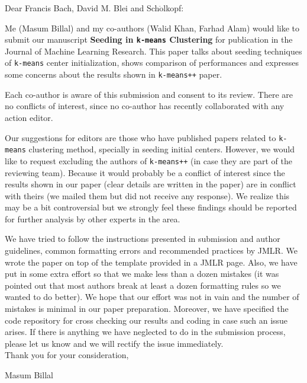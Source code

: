 \documentclass[twoside,11pt]{article} %
\begin{document}
	\noindent Dear Francis Bach, David M. Blei and Sch$\ddot{\mbox{o}}$lkopf: \\
	\medskip
	
	Me (Masum Billal) and my co-authors (Walid Khan, Farhad Alam) would like to submit our manuscript \textbf{Seeding in \texttt{k-means} Clustering} for publication in the Journal of Machine Learning Research. This paper talks about seeding techniques of \texttt{k-means} center initialization, shows comparison of performances and expresses some concerns about the results shown in \texttt{k-means++} paper.\\
	\medskip
	
	Each co-author is aware of this submission and consent to its review.  There are no conflicts of interest, since no co-author has recently collaborated with any action editor.
	\\
	\medskip
	
	Our suggestions for editors are those who have published papers related to \texttt{k-means} clustering method, specially in seeding initial centers. However, we would like to request excluding the authors of \texttt{k-means++} (in case they are part of the reviewing team). Because it would probably be a conflict of interest since the results shown in our paper (clear details are written in the paper) are in conflict with theirs (we mailed them but did not receive any response). We realize this may be a bit controversial but we strongly feel these findings should be reported for further analysis by other experts in the area.\\
	\medskip
	
	We have tried to follow the instructions presented in submission and author guidelines, common formatting errors and recommended practices by JMLR. We wrote the paper on top of the template provided in a JMLR page. Also, we have put in some extra effort so that we make less than a dozen mistakes (it was pointed out that most authors break at least a dozen formatting rules so we wanted to do better). We hope that our effort was not in vain and the number of mistakes is minimal in our paper preparation. Moreover, we have specified the code repository for cross checking our results and coding in case such an issue arises. If there is anything we have neglected to do in the submission process, please let us know and we will rectify the issue immediately. \\
	
	\medskip
	\noindent Thank you for your consideration, \\
	\medskip
	
	\noindent Masum Billal
\end{document}
